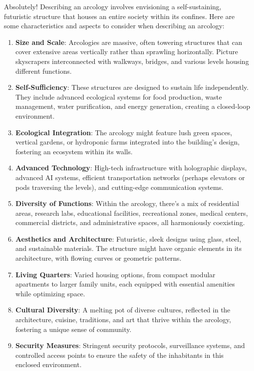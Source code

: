 \begin{aquote}
    Absolutely! Describing an arcology involves envisioning a self-sustaining, futuristic structure that houses an entire society within its confines. Here are some characteristics and aspects to consider when describing an arcology:
    \begin{enumerate}
        \item \textbf{Size and Scale}: Arcologies are massive, often towering structures that can cover extensive areas vertically rather than sprawling horizontally. Picture skyscrapers interconnected with walkways, bridges, and various levels housing different functions.
        \item \textbf{Self-Sufficiency}: These structures are designed to sustain life independently. They include advanced ecological systems for food production, waste management, water purification, and energy generation, creating a closed-loop environment.
        \item \textbf{Ecological Integration}: The arcology might feature lush green spaces, vertical gardens, or hydroponic farms integrated into the building's design, fostering an ecosystem within its walls.
        \item \textbf{Advanced Technology}: High-tech infrastructure with holographic displays, advanced AI systems, efficient transportation networks (perhaps elevators or pods traversing the levels), and cutting-edge communication systems.
        \item \textbf{Diversity of Functions}: Within the arcology, there's a mix of residential areas, research labs, educational facilities, recreational zones, medical centers, commercial districts, and administrative spaces, all harmoniously coexisting.
        \item \textbf{Aesthetics and Architecture}: Futuristic, sleek designs using glass, steel, and sustainable materials. The structure might have organic elements in its architecture, with flowing curves or geometric patterns.
        \item \textbf{Living Quarters}: Varied housing options, from compact modular apartments to larger family units, each equipped with essential amenities while optimizing space.
        \item \textbf{Cultural Diversity}: A melting pot of diverse cultures, reflected in the architecture, cuisine, traditions, and art that thrive within the arcology, fostering a unique sense of community.
        \item \textbf{Security Measures}: Stringent security protocols, surveillance systems, and controlled access points to ensure the safety of the inhabitants in this enclosed environment.

\end{enumerate}
\end{aquote}
